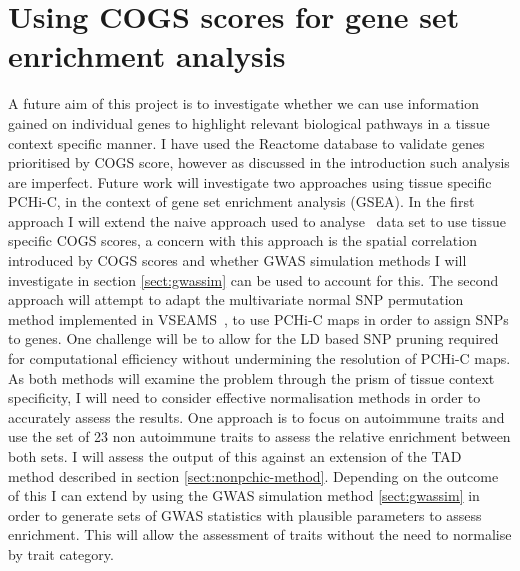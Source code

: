 \documentclass[a4paper,11pt]{report}
\begin{document}
\section{Using COGS scores for gene set enrichment analysis}
A future aim of this project is to investigate whether we can use information gained on individual genes to highlight relevant biological pathways in a tissue context specific manner. I have used the Reactome database to validate genes prioritised by COGS score, however as discussed in the introduction such analysis are imperfect. Future work will investigate two approaches using tissue specific PCHi-C, in the context of gene set enrichment analysis (GSEA). In the first approach I will extend the naive approach used to analyse~\citet{PetersLyonsLeeEtAl2016} data set to use tissue specific COGS scores, a concern with this approach is the spatial correlation introduced by COGS scores and whether GWAS simulation methods I will investigate in section \ref{sect:gwassim} can be used to account for this. The second approach will attempt to adapt the multivariate normal SNP permutation method implemented in VSEAMS~\citep{Burren2014-vh}, to use PCHi-C maps in order to assign SNPs to genes. One challenge will be to allow for the LD based SNP pruning  required for computational efficiency without undermining the resolution of PCHi-C maps. As both methods will examine the problem through the prism of tissue context specificity, I will need to consider effective normalisation methods in order to accurately assess the results. One approach is to focus on autoimmune traits and use the set of 23 non autoimmune traits to assess the relative enrichment between both sets. I will assess the output of this against an extension of the TAD method described in section \ref{sect:nonpchic-method}. Depending on the outcome of this I can extend by using the GWAS simulation method \ref{sect:gwassim} in order to generate sets of GWAS statistics with plausible parameters to assess enrichment. This will allow the assessment of traits without the need to normalise by trait category. 





\end{document}
